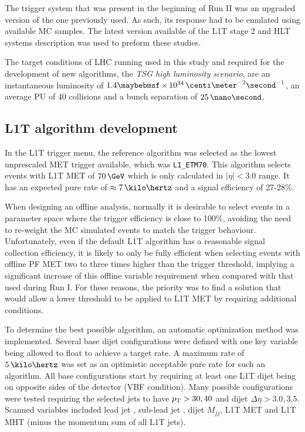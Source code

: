 The trigger system that was present in the beginning of Run II was an upgraded version of the one previously used. As such, its response had to be emulated using available \gls{MC} samples. The latest version available of the \gls{L1T} stage 2 and \gls{HLT} systems description was used to preform these studies.

The target conditions of \gls{LHC} running used in this study and required for the development of new algorithms, the \textit{\gls{TSG} high luminosity scenario}, are an instantaneous luminosity of  $1.4 \times 10^{34}\,\centi\meter^{-2}\second^{-1}$, an average \gls{PU} of 40 collisions and a bunch separation of $25\,\nano\second$. 

\subsection{L1T algorithm development}
\label{SECTION:RunIITriggerStudies_L1TAlgorithmDevelopment}


In the \gls{L1T} trigger menu, the reference algorithm was selected as the lowest unprescaled \gls{MET} trigger available, which was \verb|L1_ETM70|. This algorithm selects events with \gls{L1T} \gls{MET} of $70\,\GeV$ which is only calculated in $|\eta|<3.0$ range. It has an expected pure rate of $\approx 7\,\kilo\hertz$ and a signal efficiency of 27-28\%. 

When designing an offline analysis, normally it is desirable to select events in a parameter space where the trigger efficiency is close to 100\%, avoiding the need to re-weight the \gls{MC} simulated events to match the trigger behaviour. Unfortunately, even if the default \gls{L1T} algorithm has a reasonable signal collection efficiency, it is likely to only be fully efficient when selecting events with offline \gls{PF} \gls{MET} two to three times higher than the trigger threshold, implying a significant increase of this offline variable requirement when compared with that used during Run I. For these reasons, the priority was to find a solution that would allow a lower threshold to be applied to \gls{L1T} \gls{MET} by requiring additional conditions.

To determine the best possible algorithm, an automatic optimization method was implemented. Several base dijet configurations were defined with one key variable being allowed to float to achieve a target rate. A maximum rate of $5\,\kilo\hertz$ was set as an optimistic acceptable pure rate for such an algorithm. All base configurations start by requiring at least one \gls{L1T} dijet being on opposite sides of the detector (\gls{VBF} condition). Many possible configurations were tested requiring the selected jets to have  $p_{\mathrm{T}}>{30,40}$ and dijet $\Delta\eta>{3.0,3.5}$. Scanned variables included lead jet \pt, sub-lead jet \pt, dijet $M_{jj}$, \gls{L1T} \gls{MET} and \gls{L1T} \gls{MHT} (minus the momentum sum of all \gls{L1T} jets). 

